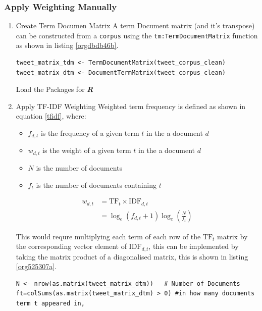 \documentclass[11pt]{article}
\begin{document}
\subsubsection{Apply Weighting Manually}
\label{sec:orgbb8a8c7}
\begin{enumerate}
\item Create Term Documen Matrix
\label{sec:org9f5757a}
A term Document matrix (and it's transpose) can be constructed from a \texttt{corpus} using the
\texttt{tm:TermDocumentMatrix} function as shown in listing \ref{orgdbdb46b}.

\begin{listing}[htbp]
\begin{verbatim}
tweet_matrix_tdm <- TermDocumentMatrix(tweet_corpus_clean)
tweet_matrix_dtm <- DocumentTermMatrix(tweet_corpus_clean)
\end{verbatim}
\caption{\label{orgdbdb46b}Load the Packages for \textbf{\textbf{\emph{R}}}}
\end{listing}

\item Apply TF-IDF Weighting
\label{sec:org1216a9a}
Weighted term frequency is defined as shown in equation \eqref{tfidf}, where:

\begin{itemize}
\item \(f_{d,t}\) is the frequency of a given term \(t\) in the a document \(d\)
\item \(w_{d,t}\) is the weight of a given term \(t\) in the a document \(d\)
\item \(N\) is the number of documents
\item \(f_{t}\) is the number of documents containing \(t\)
\end{itemize}

\begin{equation}\begin{aligned}
w_{d, t} &=\mathrm{TF}_{t} \times \mathrm{IDF}_{d, t} \\
&=\log _{e}\left(f_{d, t}+1\right) \log _{e}\left(\frac{N}{f_{t}}\right) \label{tfidf}
\end{aligned}\end{equation}

This would requre multiplying each term of each row of the \(\mathrm{TF}_{t}\) matrix by the corresponding vector element of \(\mathrm{IDF}_{d,t}\), this can be implemented by taking the matrix product of a diagonalised matrix, this is shown in listing \ref{org525307a}.

\begin{listing}[htbp]
\begin{verbatim}
N <- nrow(as.matrix(tweet_matrix_dtm))   # Number of Documents
ft=colSums(as.matrix(tweet_matrix_dtm) > 0) #in how many documents term t appeared in,


\end{verbatim}
\end{listing}
\end{enumerate}
\end{document}
